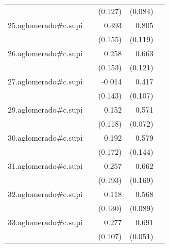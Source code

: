{\begin{longtable}{l*{4}{D{.}{.}{-1}}}
            &                     &     (0.127)         &     (0.084)         &                     \\
\addlinespace
25.aglomerado#c.supi&                     &       0.393\sym{*}  &       0.805\sym{***}&                     \\
            &                     &     (0.155)         &     (0.119)         &                     \\
\addlinespace
26.aglomerado#c.supi&                     &       0.258         &       0.663\sym{***}&                     \\
            &                     &     (0.153)         &     (0.121)         &                     \\
\addlinespace
27.aglomerado#c.supi&                     &      -0.014         &       0.417\sym{***}&                     \\
            &                     &     (0.143)         &     (0.107)         &                     \\
\addlinespace
29.aglomerado#c.supi&                     &       0.152         &       0.571\sym{***}&                     \\
            &                     &     (0.118)         &     (0.072)         &                     \\
\addlinespace
30.aglomerado#c.supi&                     &       0.192         &       0.579\sym{***}&                     \\
            &                     &     (0.172)         &     (0.144)         &                     \\
\addlinespace
31.aglomerado#c.supi&                     &       0.257         &       0.662\sym{***}&                     \\
            &                     &     (0.193)         &     (0.169)         &                     \\
\addlinespace
32.aglomerado#c.supi&                     &       0.118         &       0.568\sym{***}&                     \\
            &                     &     (0.130)         &     (0.089)         &                     \\
\addlinespace
33.aglomerado#c.supi&                     &       0.277\sym{**} &       0.691\sym{***}&                     \\
            &                     &     (0.107)         &     (0.051)         &                     \\

\end{longtable}}
